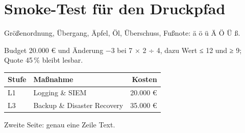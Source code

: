 \documentclass[a4paper]{article}
\begin{document}
\section*{Smoke-Test für den Druckpfad}

Größenordnung, Übergang, Äpfel, Öl, Überschuss, Fußnote: ä ö ü Ä Ö Ü ß.

Budget 20.000 € und Änderung −3 bei 7 × 2 ÷ 4, dazu Wert ≤ 12 und ≥ 9; Quote 45\,\% bleibt lesbar.

\medskip
\begin{tabularx}{\linewidth}{|l|X|r|}
  \hline
  \rowcolor{mhpblue}\color{white}\bfseries Stufe & \color{white}\bfseries Maßnahme & \color{white}\bfseries Kosten \\
  \hline
  \textcolor{levelone}{L1} & Logging \& SIEM & 20.000 € \\
  \hline
  \textcolor{levelthree}{L3} & Backup \& Disaster Recovery & 35.000 € \\
  \hline
\end{tabularx}

\newpage
Zweite Seite: genau eine Zeile Text.
\end{document}
